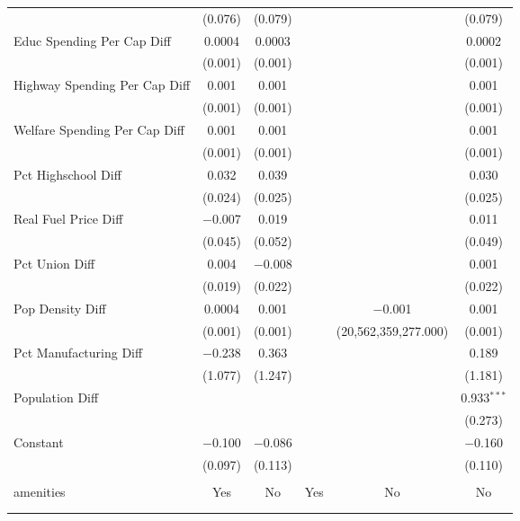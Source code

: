 \begin{table}[!htbp]
\begin{tabular}{@{\extracolsep{5pt}}lccccc}
  & (0.076) & (0.079) &  &  & (0.079) \\ 
  Educ Spending Per Cap Diff & 0.0004 & 0.0003 &  &  & 0.0002 \\ 
  & (0.001) & (0.001) &  &  & (0.001) \\ 
  Highway Spending Per Cap Diff & 0.001 & 0.001 &  &  & 0.001 \\ 
  & (0.001) & (0.001) &  &  & (0.001) \\ 
  Welfare Spending Per Cap Diff & 0.001 & 0.001 &  &  & 0.001 \\ 
  & (0.001) & (0.001) &  &  & (0.001) \\ 
  Pct Highschool Diff & 0.032 & 0.039 &  &  & 0.030 \\ 
  & (0.024) & (0.025) &  &  & (0.025) \\ 
  Real Fuel Price Diff & $-$0.007 & 0.019 &  &  & 0.011 \\ 
  & (0.045) & (0.052) &  &  & (0.049) \\ 
  Pct Union Diff & 0.004 & $-$0.008 &  &  & 0.001 \\ 
  & (0.019) & (0.022) &  &  & (0.022) \\ 
  Pop Density Diff & 0.0004 & 0.001 &  & $-$0.001 & 0.001 \\ 
  & (0.001) & (0.001) &  & (20,562,359,277.000) & (0.001) \\ 
  Pct Manufacturing Diff & $-$0.238 & 0.363 &  &  & 0.189 \\ 
  & (1.077) & (1.247) &  &  & (1.181) \\ 
  Population Diff &  &  &  &  & 0.933$^{***}$ \\ 
  &  &  &  &  & (0.273) \\ 
  Constant & $-$0.100 & $-$0.086 &  &  & $-$0.160 \\ 
  & (0.097) & (0.113) &  &  & (0.110) \\ 
 \hline \\[-1.8ex] 
amenities & Yes & No & Yes & No & No \\ 
\hline \\[-1.8ex] 
\hline 
\hline \\[-1.8ex] 
\end{tabular} 
\end{table} 
